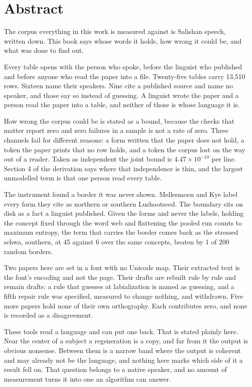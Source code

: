 \chapter*{Abstract}

The corpus everything in this work is measured against is Salishan speech, written down. This book
says whose words it holds, how wrong it could be, and what was done to find out.

Every table opens with the person who spoke, before the linguist who published and before anyone who
read the paper into a file. Twenty-five tables carry 13,510 rows. Sixteen name their speakers. Nine
cite a published source and name no speaker, and those say so instead of guessing. A linguist wrote
the paper and a person read the paper into a table, and neither of those is whose language it is.

How wrong the corpus could be is stated as a bound, because the checks that matter report
zero and zero failures in a sample is not a rate of zero. Three channels fail for different reasons:
a form written that the paper does not hold, a token the paper prints that no row holds, and a token
the corpus lost on the way out of a reader. Taken as independent the joint bound is
$4.47 \times 10^{-10}$ per line. Section 4 of the derivation says where that independence is thin,
and the largest unmodelled term is that one person read every table.

The instrument found a border it was never shown. Mellesmoen and Kye label every form they cite as
northern or southern Lushootseed. The boundary sits on disk as a fact a linguist published. Given
the forms and never the labels, holding the concept fixed through the word web and flattening the
pooled run counts to maximum entropy, the term that carries the border comes back as the stressed
schwa, southern, at 45 against 6 over the same concepts, beaten by 1 of 200 random borders.

Two papers here are set in a font with no Unicode map. Their extracted text is the font's encoding
and not the page. Their drafts are rebuilt rule by rule and remain drafts: a rule that guesses at
labialization is named as guessing, and a fifth repair rule was specified, measured to change nothing,
and withdrawn. Five more papers hold none of their own orthography. Each contributes zero, and none
is recorded as a disagreement.

These tools read a language and can put one back. That is stated plainly here.
Near the center of a subject a regeneration is a copy, and far from it the output is
obvious nonsense. Between them is a narrow band where the output is coherent and may already not be
the language, and nothing here marks which side of it a result fell on. That question belongs to a
native speaker, and no amount of measurement turns it into one an algorithm can answer.
\cleardoublepage
